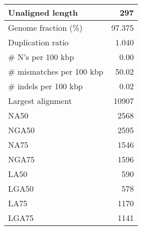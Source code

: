 \documentclass[12pt,a4paper]{article}
\begin{document}
\begin{table}[ht]
\begin{center}
\begin{tabular}{|l*{1}{|r}|}
Unaligned length & 297 \\ \hline
Genome fraction (\%) & 97.375 \\ \hline
Duplication ratio & 1.040 \\ \hline
\# N's per 100 kbp & 0.00 \\ \hline
\# mismatches per 100 kbp & 50.02 \\ \hline
\# indels per 100 kbp & 0.02 \\ \hline
Largest alignment & 10907 \\ \hline
NA50 & 2568 \\ \hline
NGA50 & 2595 \\ \hline
NA75 & 1546 \\ \hline
NGA75 & 1596 \\ \hline
LA50 & 590 \\ \hline
LGA50 & 578 \\ \hline
LA75 & 1170 \\ \hline
LGA75 & 1141 \\ \hline
\end{tabular}
\end{center}
\end{table}
\end{document}
